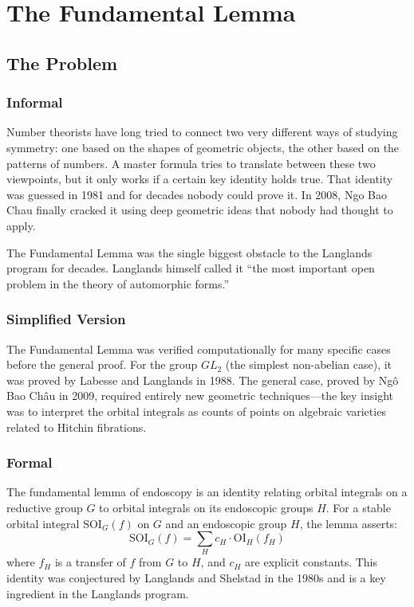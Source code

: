 \let\LocalMacro\relax

\chapter{The Fundamental Lemma}

\section{The Problem}

\subsection{Informal}
Number theorists have long tried to connect two very different ways of studying symmetry: one based on the shapes of geometric objects, the other based on the patterns of numbers. A master formula tries to translate between these two viewpoints, but it only works if a certain key identity holds true. That identity was guessed in 1981 and for decades nobody could prove it. In 2008, Ngo Bao Chau finally cracked it using deep geometric ideas that nobody had thought to apply.

\begin{historicalbox}
The Fundamental Lemma was the single biggest obstacle to the Langlands program for decades. Langlands himself called it ``the most important open problem in the theory of automorphic forms.''
\end{historicalbox}

\subsection{Simplified Version}
The Fundamental Lemma was verified computationally for many specific cases before the general proof. For the group $GL_2$ (the simplest non-abelian case), it was proved by Labesse and Langlands in 1988. The general case, proved by Ngô Bao Châu in 2009, required entirely new geometric techniques---the key insight was to interpret the orbital integrals as counts of points on algebraic varieties related to Hitchin fibrations.

\subsection{Formal}
The fundamental lemma of endoscopy is an identity relating orbital integrals on a reductive group $G$ to orbital integrals on its endoscopic groups $H$. For a stable orbital integral $\mathrm{SOI}_G(f)$ on $G$ and an endoscopic group $H$, the lemma asserts:
\[
\mathrm{SOI}_G(f) = \sum_{H} c_H \cdot \mathrm{OI}_H(f_H)
\]
where $f_H$ is a transfer of $f$ from $G$ to $H$, and $c_H$ are explicit constants. This identity was conjectured by Langlands and Shelstad in the 1980s and is a key ingredient in the Langlands program.

